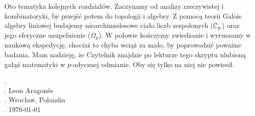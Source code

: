 Oto tematyka kolejnych rozdziałów.
Zaczynamy od analizy rzeczywistej i kombinatoryki, by przejść potem do topologii i algebry.
Z pomocą teorii Galois algebry liniowej budujemy niearchimedesowe ciało liczb zespolonych ($\mathbb C_p$) oraz jego sferyczne uzupełnienie ($\Omega_p$).
W połowie kończymy zwiedzanie i wyruszamy w naukową ekspedycję, chociaż to chyba wciąż za mało, by poprowadzić poważne badania.
Mam nadzieję, że Czytelnik znajdzie po lekturze tego skryptu ulubioną gałąź matematyki w $p$-adycznej odmianie.
Oby się tylko na niej nie powiesił.


{\color{white}.} \hfill \\
{\color{white}.} \hfill Leon Aragonés\\
{\color{white}.} \hfill Wrocław, Polandia\\
{\color{white}.} \hfill \today
